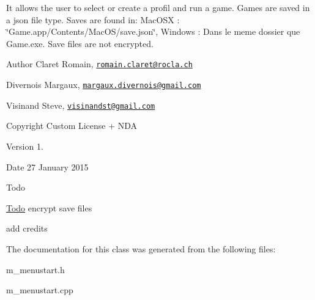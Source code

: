 It allows the user to select or create a profil and run a game. Games are saved in a json file type. Saves are found in\+: Mac\+O\+S\+X \+: \char`\"{}\+Game.\+app/\+Contents/\+Mac\+O\+S/save.\+json\char`\"{}, Windows \+: Dans le meme dossier que Game.\+exe. Save files are not encrypted. \begin{DoxyAuthor}{Author}
Claret Romain, \href{mailto:romain.claret@rocla.ch}{\tt romain.\+claret@rocla.\+ch} 

Divernois Margaux, \href{mailto:margaux.divernois@gmail.com}{\tt margaux.\+divernois@gmail.\+com} 

Visinand Steve, \href{mailto:visinandst@gmail.com}{\tt visinandst@gmail.\+com} 
\end{DoxyAuthor}
\begin{DoxyCopyright}{Copyright}
Custom License + N\+D\+A 
\end{DoxyCopyright}
\begin{DoxyVersion}{Version}
1. 
\end{DoxyVersion}
\begin{DoxyDate}{Date}
27 January 2015 
\end{DoxyDate}
\begin{DoxyRefDesc}{Todo}
\item[\hyperlink{todo__todo000013}{Todo}]encrypt save files 

add credits \end{DoxyRefDesc}


The documentation for this class was generated from the following files\+:\begin{DoxyCompactItemize}
\item 
m\+\_\+menustart.\+h\item 
m\+\_\+menustart.\+cpp\end{DoxyCompactItemize}
